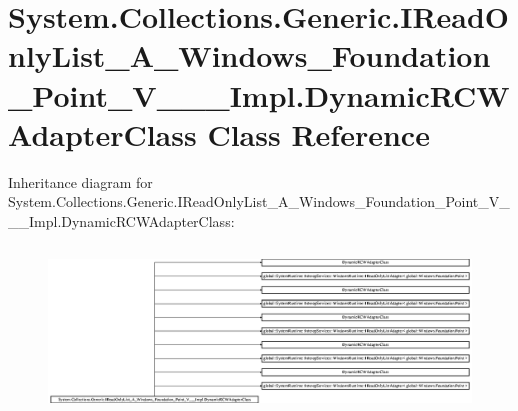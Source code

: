 \hypertarget{class_system_1_1_collections_1_1_generic_1_1_i_read_only_list___a___windows___foundation___pointf8b8009c5a56ca9e6410026ae080e8ed}{}\section{System.\+Collections.\+Generic.\+I\+Read\+Only\+List\+\_\+\+A\+\_\+\+Windows\+\_\+\+Foundation\+\_\+\+Point\+\_\+\+V\+\_\+\+\_\+\+\_\+\+Impl.\+Dynamic\+R\+C\+W\+Adapter\+Class Class Reference}
\label{class_system_1_1_collections_1_1_generic_1_1_i_read_only_list___a___windows___foundation___pointf8b8009c5a56ca9e6410026ae080e8ed}
Inheritance diagram for System.\+Collections.\+Generic.\+I\+Read\+Only\+List\+\_\+\+A\+\_\+\+Windows\+\_\+\+Foundation\+\_\+\+Point\+\_\+\+V\+\_\+\+\_\+\+\_\+\+Impl.\+Dynamic\+R\+C\+W\+Adapter\+Class\+:\begin{figure}[H]
\begin{center}
\leavevmode
\includegraphics[height=4.522761cm]{class_system_1_1_collections_1_1_generic_1_1_i_read_only_list___a___windows___foundation___pointf8b8009c5a56ca9e6410026ae080e8ed}
\end{center}
\end{figure}
